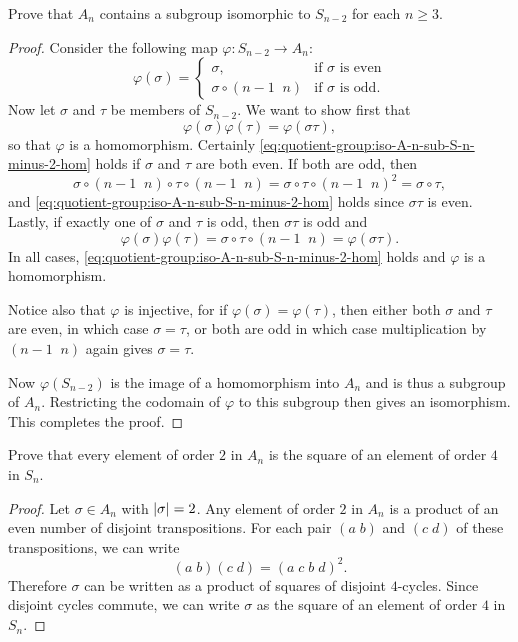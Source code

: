  Prove that $A_n$ contains a subgroup isomorphic to
$S_{n-2}$ for each $n\geq3$.
\begin{proof}
  Consider the following map $\varphi\colon S_{n-2}\to A_n$:
  \begin{equation*}
    \varphi(\sigma) =
    \begin{cases}
      \sigma, & \text{if $\sigma$ is even} \\
      \sigma\circ(n-1\;\;n) & \text{if $\sigma$ is odd.}
    \end{cases}
  \end{equation*}
  Now let $\sigma$ and $\tau$ be members of $S_{n-2}$. We want to show
  first that
  \begin{equation}
    \label{eq:quotient-group:iso-A-n-sub-S-n-minus-2-hom}
    \varphi(\sigma)\varphi(\tau) = \varphi(\sigma\tau),
  \end{equation}
  so that $\varphi$ is a homomorphism. Certainly
  \eqref{eq:quotient-group:iso-A-n-sub-S-n-minus-2-hom} holds if
  $\sigma$ and $\tau$ are both even. If both are odd, then
  \begin{equation*}
    \sigma\circ(n-1\;\;n)\circ\tau\circ(n-1\;\;n)
    = \sigma\circ\tau\circ(n-1\;\;n)^2
    = \sigma\circ\tau,
  \end{equation*}
  and \eqref{eq:quotient-group:iso-A-n-sub-S-n-minus-2-hom} holds
  since $\sigma\tau$ is even. Lastly, if exactly one of $\sigma$ and
  $\tau$ is odd, then $\sigma\tau$ is odd and
  \begin{equation*}
    \varphi(\sigma)\varphi(\tau) = \sigma\circ\tau\circ(n-1\;\;n)
    = \varphi(\sigma\tau).
  \end{equation*}
  In all cases, \eqref{eq:quotient-group:iso-A-n-sub-S-n-minus-2-hom}
  holds and $\varphi$ is a homomorphism.

  Notice also that $\varphi$ is injective, for if
  $\varphi(\sigma) = \varphi(\tau)$, then either both $\sigma$ and
  $\tau$ are even, in which case $\sigma = \tau$, or both are odd in
  which case multiplication by $(n-1\;\;n)$ again gives
  $\sigma = \tau$.

  Now $\varphi(S_{n-2})$ is the image of a homomorphism into $A_n$ and
  is thus a subgroup of $A_n$. Restricting the codomain of $\varphi$
  to this subgroup then gives an isomorphism. This completes the
  proof.
\end{proof}

 Prove that every element of order $2$ in $A_n$ is the
square of an element of order $4$ in $S_n$.
\begin{proof}
  Let $\sigma\in A_n$ with $\lvert{\sigma}\rvert = 2$. Any element of order
  $2$ in $A_n$ is a product of an even number of disjoint
  transpositions. For each pair $(a\;b)$ and $(c\;d)$ of these
  transpositions, we can write
  \begin{equation*}
    (a\;b)(c\;d) = (a\;c\;b\;d)^2.
  \end{equation*}
  Therefore $\sigma$ can be written as a product of squares of
  disjoint $4$-cycles. Since disjoint cycles commute, we can write
  $\sigma$ as the square of an element of order $4$ in $S_n$.
\end{proof}
